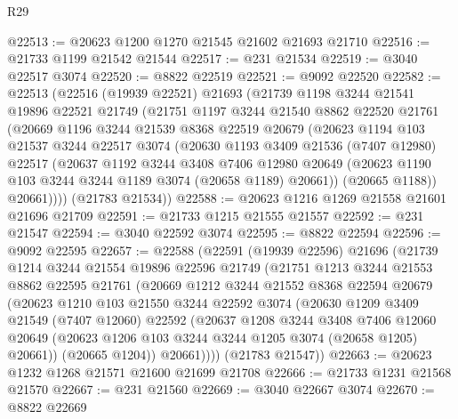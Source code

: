 \begin{lexlean}{R29}
\begin{coremodule}
@22513 := @20623 @1200 @1270 @21545 @21602 @21693 @21710
@22516 := @21733 @1199 @21542 @21544
@22517 := @231 @21534
@22519 := @3040 @22517 @3074
@22520 := @8822 @22519
@22521 := @9092 @22520
@22582 := @22513
    (@22516
      (@19939 @22521)
      @21693
      (@21739
        @1198
        @3244
        @21541
        @19896
        @22521
        @21749
        (@21751
          @1197
          @3244
          @21540
          @8862
          @22520
          @21761
          (@20669
            @1196
            @3244
            @21539
            @8368
            @22519
            @20679
            (@20623
              @1194
              @103
              @21537
              @3244
              @22517
              @3074
              (@20630
                @1193
                @3409
                @21536
                (@7407 @12980)
                @22517
                (@20637
                  @1192
                  @3244
                  @3408
                  @7406
                  @12980
                  @20649
                  (@20623 @1190 @103 @3244 @3244 @1189 @3074 (@20658 @1189) @20661))
                (@20665 @1188))
              @20661))))
      (@21783 @21534))
@22588 := @20623 @1216 @1269 @21558 @21601 @21696 @21709
@22591 := @21733 @1215 @21555 @21557
@22592 := @231 @21547
@22594 := @3040 @22592 @3074
@22595 := @8822 @22594
@22596 := @9092 @22595
@22657 := @22588
    (@22591
      (@19939 @22596)
      @21696
      (@21739
        @1214
        @3244
        @21554
        @19896
        @22596
        @21749
        (@21751
          @1213
          @3244
          @21553
          @8862
          @22595
          @21761
          (@20669
            @1212
            @3244
            @21552
            @8368
            @22594
            @20679
            (@20623
              @1210
              @103
              @21550
              @3244
              @22592
              @3074
              (@20630
                @1209
                @3409
                @21549
                (@7407 @12060)
                @22592
                (@20637
                  @1208
                  @3244
                  @3408
                  @7406
                  @12060
                  @20649
                  (@20623 @1206 @103 @3244 @3244 @1205 @3074 (@20658 @1205) @20661))
                (@20665 @1204))
              @20661))))
      (@21783 @21547))
@22663 := @20623 @1232 @1268 @21571 @21600 @21699 @21708
@22666 := @21733 @1231 @21568 @21570
@22667 := @231 @21560
@22669 := @3040 @22667 @3074
@22670 := @8822 @22669

\end{coremodule}
\end{lexlean}
